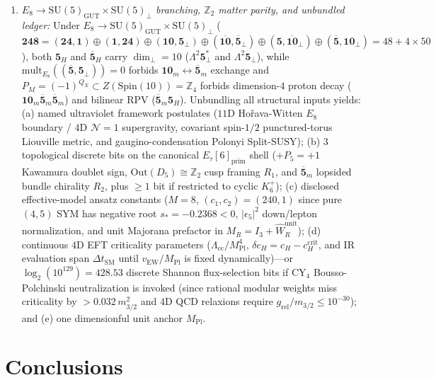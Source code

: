 \documentclass[aps,prd,twocolumn,nofootinbib,floatfix]{revtex4-2}
\begin{document}
\begin{enumerate}
    \item \emph{$E_8 \to \mathrm{SU}(5)_{\mathrm{GUT}}\times\mathrm{SU}(5)_\perp$ branching, $\mathbb{Z}_2$ matter parity, and unbundled ledger:} Under $E_8 \to \mathrm{SU}(5)_{\mathrm{GUT}}\times\mathrm{SU}(5)_\perp$ ($\mathbf{248} = (\mathbf{24},\mathbf{1})\oplus(\mathbf{1},\mathbf{24})\oplus(\mathbf{10},\mathbf{5}_\perp)\oplus(\overline{\mathbf{10}},\overline{\mathbf{5}}_\perp)\oplus(\mathbf{5},\overline{\mathbf{10}}_\perp)\oplus(\overline{\mathbf{5}},\mathbf{10}_\perp) = 48 + 4\times 50$), both $\mathbf{5}_H$ and $\overline{\mathbf{5}}_H$ carry $\dim_\perp = 10$ ($\Lambda^2\mathbf{5}_\perp^*$ and $\Lambda^2\mathbf{5}_\perp$), while $\mathrm{mult}_{E_8}((\overline{\mathbf{5}},\mathbf{5}_\perp)) = 0$ forbids $\mathbf{10}_m\leftrightarrow\overline{\mathbf{5}}_m$ exchange and $P_M = (-1)^{Q_X} \subset Z(\mathrm{Spin}(10)) = \mathbb{Z}_4$ forbids dimension-$4$ proton decay ($\mathbf{10}_m\overline{\mathbf{5}}_m\overline{\mathbf{5}}_m$) and bilinear RPV ($\overline{\mathbf{5}}_m\mathbf{5}_H$). Unbundling all structural inputs yields: (a) named ultraviolet framework postulates ($11\mathrm{D}$ Ho\v{r}ava-Witten $E_8$ boundary / $4\mathrm{D}$ $\mathcal{N}=1$ supergravity, covariant spin-$1/2$ punctured-torus Liouville metric, and gaugino-condensation Polonyi Split-SUSY); (b) $3$ topological discrete bits on the canonical $E_\tau[6]_{\mathrm{prim}}$ shell ($+P_5 = +1$ Kawamura doublet sign, $\mathrm{Out}(D_5)\cong\mathbb{Z}_2$ cusp framing $R_1$, and $\overline{\mathbf{5}}_m$ lopsided bundle chirality $R_2$, plus $\ge 1$ bit if restricted to cyclic $K_6^+$); (c) disclosed effective-model ansatz constants ($M=8$, $(c_1,c_2)=(240,1)$ since pure $(4,5)$ SYM has negative root $s_* = -0.2368 < 0$, $|\epsilon_5|^2$ down/lepton normalization, and unit Majorana prefactor in $M_R = I_3 + \widehat{W}_R^{\mathrm{unit}}$); (d) continuous $4\mathrm{D}$ EFT criticality parameters ($\Lambda_{\mathrm{cc}}/M_{\mathrm{Pl}}^4$, $\delta c_H = c_H - c_H^{\mathrm{crit}}$, and IR evaluation span $\Delta t_{\mathrm{SM}}$ until $v_{\mathrm{EW}}/M_{\mathrm{Pl}}$ is fixed dynamically)---or $\log_2(10^{129}) = 428.53$ discrete Shannon flux-selection bits if CY$_4$ Bousso-Polchinski neutralization is invoked (since rational modular weights miss criticality by $>0.032\,m_{3/2}^2$ and $4\mathrm{D}$ QCD relaxions require $g_{\mathrm{rel}}/m_{3/2}\le 10^{-30}$); and (e) one dimensionful unit anchor $M_{\mathrm{Pl}}$.
\end{enumerate}

\section{Conclusions}
\label{sec:conclusions}
\end{document}
